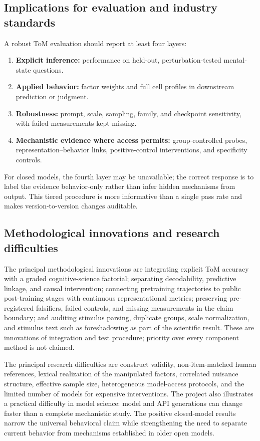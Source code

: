 \subsection{Implications for evaluation and industry standards}

A robust ToM evaluation should report at least four layers:
\begin{enumerate}[leftmargin=*]
    \item \textbf{Explicit inference:} performance on held-out, perturbation-tested mental-state questions.
    \item \textbf{Applied behavior:} factor weights and full cell profiles in downstream prediction or judgment.
    \item \textbf{Robustness:} prompt, scale, sampling, family, and checkpoint sensitivity, with failed measurements kept missing.
    \item \textbf{Mechanistic evidence where access permits:} group-controlled probes, representation--behavior links, positive-control interventions, and specificity controls.
\end{enumerate}
For closed models, the fourth layer may be unavailable; the correct response is to label the evidence behavior-only rather than infer hidden mechanisms from output.
This tiered procedure is more informative than a single pass rate and makes version-to-version changes auditable.

\subsection{Methodological innovations and research difficulties}

The principal methodological innovations are integrating explicit ToM accuracy with a graded cognitive-science factorial; separating decodability, predictive linkage, and causal intervention; connecting pretraining trajectories to public post-training stages with continuous representational metrics; preserving pre-registered falsifiers, failed controls, and missing measurements in the claim boundary; and auditing stimulus parsing, duplicate groups, scale normalization, and stimulus text such as foreshadowing as part of the scientific result.
These are innovations of integration and test procedure; priority over every component method is not claimed.

The principal research difficulties are construct validity, non-item-matched human references, lexical realization of the manipulated factors, correlated nuisance structure, effective sample size, heterogeneous model-access protocols, and the limited number of models for expensive interventions.
The project also illustrates a practical difficulty in model science: model and API generations can change faster than a complete mechanistic study.
The positive closed-model results narrow the universal behavioral claim while strengthening the need to separate current behavior from mechanisms established in older open models.

